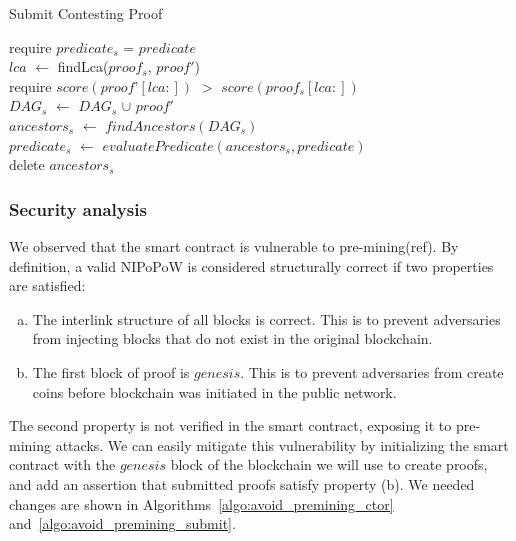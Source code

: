 \begin{algorithm}
    \caption{Submit Contesting Proof}
    \label{algo:contest_old}
    require $predicate_{s}$ = $predicate$\\
    $lca$ $\leftarrow$ findLca($proof_{s}$, $proof'$)\\
    require $score(proof’[lca:])$ $>$ $score(proof_{s}[lca:])$ \\
    $DAG_{s}$ $\leftarrow$ $DAG_{s}$ $\cup$ $proof'$\\
    $ancestors_{s}$ $\leftarrow$ $findAncestors(DAG_{s})$\\
    $predicate_{s}$ $\leftarrow$ $evaluatePredicate(ancestors_{s},
    predicate)$\\
    delete $ancestors_{s}$\\
\end{algorithm}

\subsubsection{Security analysis}

We observed that the smart contract is vulnerable to pre-mining(ref). By
definition, a valid NIPoPoW is considered structurally correct if two
properties are satisfied:

\begin{enumerate}[(a)]

\item The interlink structure of all blocks is correct. This is to prevent
    adversaries from injecting blocks that do not exist in the original
    blockchain.

\item The first block of proof is $genesis$. This is to prevent adversaries
    from create coins before blockchain was initiated in the public network.

\end{enumerate}

The second property is not verified in the smart contract, exposing it to
pre-mining attacks. We can easily mitigate this vulnerability by initializing
the smart contract with the $genesis$ block of the blockchain we will use to
create proofs, and add an assertion that submitted proofs satisfy property (b).
We needed changes are shown in Algorithms~\ref{algo:avoid_premining_ctor}
and~\ref{algo:avoid_premining_submit}.


